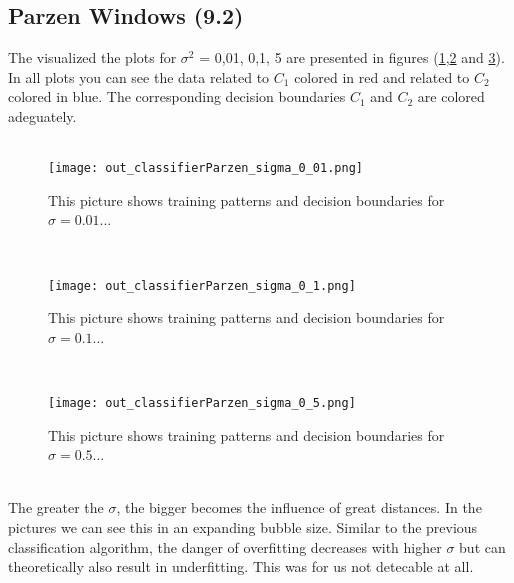 \documentclass[a4paper,headings=small]{scrartcl}
\begin{document}
\subsection{Parzen Windows (9.2)}
The visualized the plots for $\sigma^2$ = 0,01, 0,1, 5 are presented in figures (\ref{fig:out_classifierParzen_sigma_0.01},\ref{fig:out_classifierParzen_sigma_0.1} and \ref{fig:out_classifierParzen_sigma_0.5}).\\
In all plots you can see the data related to $C_1$ colored in red and related to $C_2$ colored in blue. The corresponding decision boundaries $C_1$ and $C_2$ are colored adeguately.  \\
\\
\begin{figure}[htbp]
\centering
\texttt{[image: out\_classifierParzen\_sigma\_0\_01.png]}
\caption{This picture shows training patterns and decision boundaries for $\sigma=0.01$...}
\label{fig:out_classifierParzen_sigma_0.01}
\end{figure}
\\
\begin{figure}[htbp]
\centering
\texttt{[image: out\_classifierParzen\_sigma\_0\_1.png]}
\caption{This picture shows training patterns and decision boundaries for $\sigma=0.1$...}
\label{fig:out_classifierParzen_sigma_0.1}
\end{figure}
\\
\begin{figure}[htbp]
\centering
\texttt{[image: out\_classifierParzen\_sigma\_0\_5.png]}
\caption{This picture shows training patterns and decision boundaries for $\sigma=0.5$...}
\label{fig:out_classifierParzen_sigma_0.5}
\end{figure}
\\
The greater the $\sigma$, the bigger becomes the influence of great distances. In the pictures we can see this in an expanding bubble size. Similar to the previous classification algorithm, the danger of overfitting decreases with higher $\sigma$ but can theoretically also result in underfitting. This was for us not detecable at all.
\end{document}
